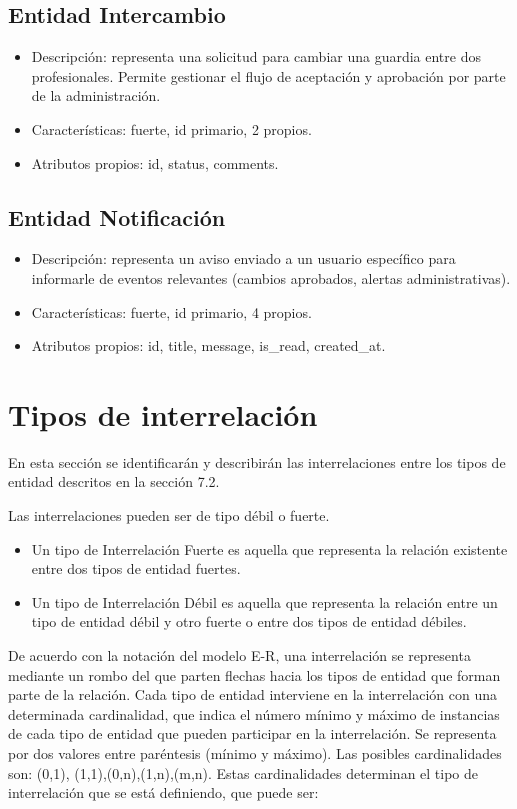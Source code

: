 \subsection{Entidad Intercambio}
\begin{itemize}
    \item Descripción: representa una solicitud para cambiar una guardia entre dos profesionales. Permite gestionar el flujo de aceptación y aprobación por parte de la administración.
    \item Características: fuerte, id primario, 2 propios.
    \item Atributos propios: id, status, comments.
\end{itemize}

\subsection{Entidad Notificación}
\begin{itemize}
    \item Descripción: representa un aviso enviado a un usuario específico para informarle de eventos relevantes (cambios aprobados, alertas administrativas).
    \item Características: fuerte, id primario, 4 propios.
    \item Atributos propios: id, title, message, is\_read, created\_at.
\end{itemize}

\section{Tipos de interrelación} \label{sec:relaciones}
En esta sección se identificarán y describirán las interrelaciones entre los tipos de entidad descritos en la sección 7.2.

Las interrelaciones pueden ser de tipo débil o fuerte.

\begin{itemize}
    \item Un tipo de Interrelación Fuerte es aquella que representa la relación existente entre dos tipos de entidad fuertes.

    \item Un tipo de Interrelación Débil es aquella que representa la relación entre un tipo de entidad débil y otro fuerte o entre dos tipos de entidad débiles.
\end{itemize}

De acuerdo con la notación del modelo E-R, una interrelación se representa mediante un rombo del que parten flechas hacia los tipos de entidad que forman parte de la relación. Cada tipo de entidad interviene en la interrelación con una determinada cardinalidad, que indica el número mínimo y máximo de instancias de cada tipo de entidad que pueden participar en la interrelación. Se representa por dos valores entre paréntesis (mínimo y máximo). Las posibles cardinalidades son: (0,1), (1,1),(0,n),(1,n),(m,n). Estas cardinalidades determinan el tipo de interrelación que se está definiendo, que puede ser:

